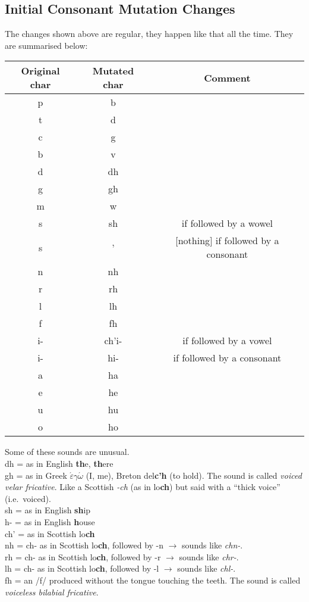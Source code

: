 \subsection{Initial Consonant Mutation Changes}
The changes shown above are regular, they happen like that all the time. They are summarised below:
\begin{table}[H]
\centering
\begin{tabu}{c|c|c}
  \textbf{Original char} & \textbf{Mutated char} & \textbf{Comment}\\
  \toprule
  p & b & \\
  t & d & \\
  c & g & \\
  b & v & \\
  d & dh & \\
  g & gh & \\
  m & w & \\
  s & sh & if followed by a wowel\\
  s & ' & $[$nothing$]$ if followed by a consonant\\
  n & nh & \\
  r & rh & \\
  l & lh & \\
  f & fh & \\
  i- & ch'i- & if followed by a vowel\\
  i- & hi- & if followed by a consonant\\
  a & ha & \\
  e & he & \\
  u & hu & \\
  o & ho &
\end{tabu}
\label{summary_mutated_chars}
\end{table}

Some of these sounds are unusual.\\
dh = as in English \textbf{th}e, \textbf{th}ere\\
gh = as in Greek $\acute{\varepsilon}$\textbf{$\gamma$}$\acute{\omega}$ (I, me), Breton del\textbf{c'h} (to hold). The sound is called \textit{voiced velar fricative}. Like a Scottish \textit{-ch} (as in lo\textbf{ch}) but said with a ``thick voice'' (i.e.\ voiced).\\
sh = as in English \textbf{sh}ip\\
h- = as in English \textbf{h}ouse\\
ch' = as in Scottish lo\textbf{ch}\\
nh = ch- as in Scottish lo\textbf{ch}, followed by -n $\rightarrow$ sounds like \textit{chn-}.\\
rh = ch- as in Scottish lo\textbf{ch}, followed by -r $\rightarrow$ sounds like \textit{chr-}.\\
lh = ch- as in Scottish lo\textbf{ch}, followed by -l $\rightarrow$ sounds like \textit{chl-}.\\
fh = an /f/ produced without the tongue touching the teeth. The sound is called \textit{voiceless bilabial fricative}.\\

